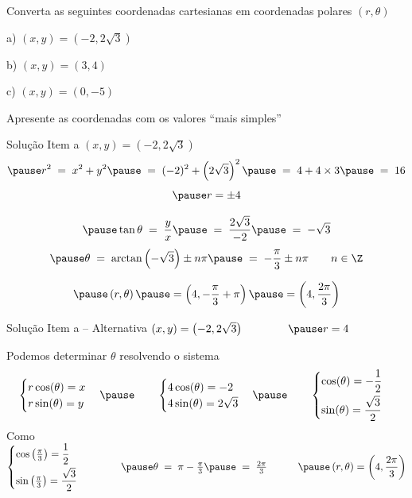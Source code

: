 \begin{question}
  Converta as seguintes coordenadas cartesianas em coordenadas polares
  $(r, \theta)$

  a) \quad \((x, y) = \left(-2, 2\sqrt{3}\right)\)

  b) \quad \((x, y) = \left(3, 4\right)\)

  c) \quad \((x, y) = \left(0, -5\right)\)

  Apresente as coordenadas com os valores ``mais simples''
\end{question}

\begin{resolution}{Solução Item a}
  \((x, y) = \left(-2, 2\sqrt{3}\right)\)
  \[
    \pause r^2 \;=\; x^2 + y^2
    \pause \;=\; (-2)^2 + \left(2\sqrt{3}\right)^2
    \pause \;=\; 4 + 4\times 3
    \pause \;=\; 16
  \]
  \[
    \pause r = \pm 4
  \]

  \[
    \pause \tan\theta \;=\; \frac{y}{x}
    \pause            \;=\; \frac{2\sqrt{3}}{-2}
    \pause            \;=\; -\sqrt{3}
  \]
  \[
    \pause \theta \;=\; \arctan\left(-\sqrt{3}\right) \pm n\pi
    \pause        \;=\; -\frac{\pi}{3} \pm n\pi
    \qquad n\in \Z
  \]

  \[
    \pause \left(r, \theta\right)
    \pause = \left(4, -\dfrac{\pi}{3}+\pi\right)
    \pause = \left(4, \dfrac{2\pi}{3}\right)
  \]
\end{resolution}

\begin{resolution}{Solução Item a -- Alternativa}
  \(
    (x, y) = \left(-2, 2\sqrt{3}\right)
    \qquad\qquad
    \pause r = 4
  \)

  \pause
  Podemos determinar $\theta$ resolvendo o sistema
  \[
    \begin{cases}
      r\cos(\theta) = x\\
      r\sin(\theta) = y
    \end{cases}
    \pause\qquad
    \begin{cases}
      4\cos(\theta) = -2\\
      4\sin(\theta) = 2\sqrt{3}
    \end{cases}
    \pause\qquad
    \begin{cases}
      \cos(\theta) = -\dfrac{1}{2}      \\[2mm]
      \sin(\theta) = \dfrac{\sqrt{3}}{2}
    \end{cases}
  \]
  \pause
  Como
  \(
    \begin{cases}
      \cos\left(\frac{\pi}{3}\right) = \dfrac{1}{2}      \\[2mm]
      \sin\left(\frac{\pi}{3}\right) = \dfrac{\sqrt{3}}{2}
    \end{cases}
    \qquad\quad
    \pause \theta \;=\; \pi - \frac{\pi}{3}
    \pause \;=\; \frac{2\pi}{3}
    \qquad\quad
    \pause \left(r, \theta\right) = \left(4, \dfrac{2\pi}{3}\right)
  \)
\end{resolution}

